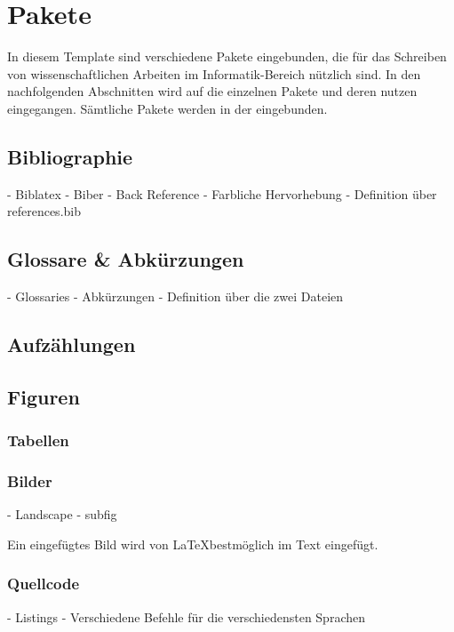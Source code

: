 \chapter{Pakete}\label{ch:packages}

In diesem Template sind verschiedene Pakete eingebunden, die für das Schreiben von wissenschaftlichen Arbeiten im Informatik-Bereich nützlich sind.
In den nachfolgenden Abschnitten wird auf die einzelnen Pakete und deren nutzen eingegangen.
Sämtliche Pakete werden in der  eingebunden.

\section{Bibliographie}\label{sec:bibliography}
- Biblatex
- Biber
- Back Reference
- Farbliche Hervorhebung
- Definition über references.bib

\section{Glossare \& Abkürzungen}\label{sec:glossaries}
- Glossaries
- Abkürzungen
- Definition über die zwei Dateien


\section{Aufzählungen}\label{sec:lists}

\section{Figuren}\label{sec:figures}

\subsection{Tabellen}\label{subsec:tables}


\subsection{Bilder}\label{subsec:images}
- Landscape
- subfig

Ein eingefügtes Bild wird von \LaTeX bestmöglich im Text eingefügt.


\subsection{Quellcode}\label{subsec:code}
- Listings
- Verschiedene Befehle für die verschiedensten Sprachen

